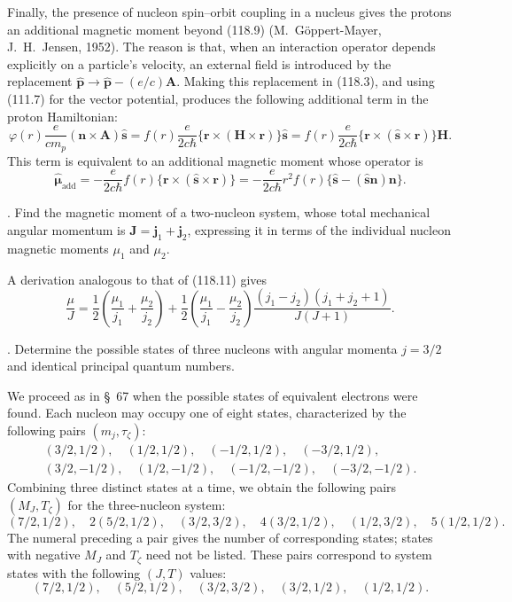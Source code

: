 Finally, the presence of nucleon spin--orbit coupling in a nucleus gives the
protons an additional magnetic moment beyond (118.9) (M.~G\"oppert-Mayer,
J.~H.~Jensen, 1952). The reason is that, when an interaction operator depends
explicitly on a particle's velocity, an external field is introduced by the
replacement $\hat{\mathbf p}\to\hat{\mathbf p}-(e/c)\mathbf A$. Making this
replacement in (118.3), and using (111.7) for the vector potential, produces
the following additional term in the proton Hamiltonian:
\[
 \varphi(r)\frac{e}{cm_p}(\mathbf n\times\mathbf A)\hat{\mathbf s}
 =f(r)\frac{e}{2c\hbar}\{\mathbf r\times(\mathbf H\times\mathbf r)\}
   \hat{\mathbf s}
 =f(r)\frac{e}{2c\hbar}
   \{\mathbf r\times(\hat{\mathbf s}\times\mathbf r)\}\mathbf H.
\]
This term is equivalent to an additional magnetic moment whose operator is
\begin{equation}
 \hat{\boldsymbol\mu}_{\text{add}}
 =-\frac{e}{2c\hbar}f(r)
   \{\mathbf r\times(\hat{\mathbf s}\times\mathbf r)\}
 =-\frac{e}{2c\hbar}r^2f(r)
 \{\hat{\mathbf s}-(\hat{\mathbf s}\mathbf n)\mathbf n\}.
 \tag{118.14}
\end{equation}

. Find the magnetic moment of a two-nucleon system, whose
total mechanical angular momentum is $\mathbf J=\mathbf j_1+\mathbf j_2$,
expressing it in terms of the individual nucleon magnetic moments $\mu_1$ and
$\mu_2$.

\SolutionHeading A derivation analogous to that of (118.11) gives
\[
 \frac\mu J=\frac12\left(\frac{\mu_1}{j_1}+\frac{\mu_2}{j_2}\right)
 +\frac12\left(\frac{\mu_1}{j_1}-\frac{\mu_2}{j_2}\right)
 \frac{(j_1-j_2)(j_1+j_2+1)}{J(J+1)}.
\]

. Determine the possible states of three nucleons with
angular momenta $j=3/2$ and identical principal quantum numbers.

\SolutionHeading We proceed as in \S~67 when the possible states
of equivalent electrons were found. Each nucleon may occupy one of eight
states, characterized by the following pairs $(m_j,\tau_\zeta)$:
\[
 \begin{gathered}
 (3/2,1/2),\quad(1/2,1/2),\quad(-1/2,1/2),\quad(-3/2,1/2),\\
 (3/2,-1/2),\quad(1/2,-1/2),\quad(-1/2,-1/2),\quad(-3/2,-1/2).
 \end{gathered}
\]
Combining three distinct states at a time, we obtain the following pairs
$(M_J,T_\zeta)$ for the three-nucleon system:
\[
 (7/2,1/2),\quad2(5/2,1/2),\quad(3/2,3/2),\quad4(3/2,1/2),
 \quad(1/2,3/2),\quad5(1/2,1/2).
\]
The numeral preceding a pair gives the number of corresponding states; states
with negative $M_J$ and $T_\zeta$ need not be listed. These pairs correspond
to system states with the following $(J,T)$ values:
\[
 (7/2,1/2),\quad(5/2,1/2),\quad(3/2,3/2),\quad(3/2,1/2),\quad(1/2,1/2).
\]

